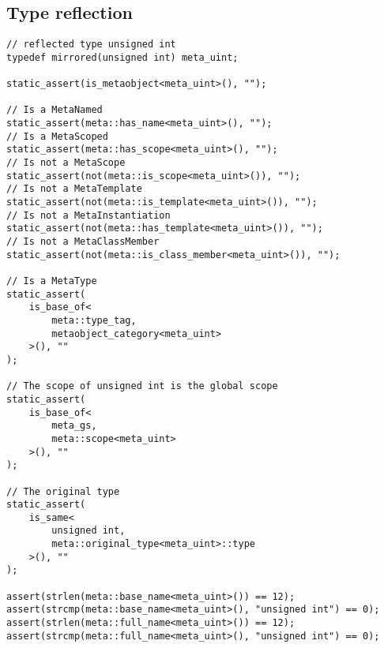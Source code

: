 \subsection{Type reflection}

\begin{verbatim}
// reflected type unsigned int
typedef mirrored(unsigned int) meta_uint;

static_assert(is_metaobject<meta_uint>(), "");

// Is a MetaNamed
static_assert(meta::has_name<meta_uint>(), "");
// Is a MetaScoped
static_assert(meta::has_scope<meta_uint>(), "");
// Is not a MetaScope
static_assert(not(meta::is_scope<meta_uint>()), "");
// Is not a MetaTemplate
static_assert(not(meta::is_template<meta_uint>()), "");
// Is not a MetaInstantiation
static_assert(not(meta::has_template<meta_uint>()), "");
// Is not a MetaClassMember
static_assert(not(meta::is_class_member<meta_uint>()), "");

// Is a MetaType
static_assert(
	is_base_of<
		meta::type_tag,
		metaobject_category<meta_uint>
	>(), ""
);

// The scope of unsigned int is the global scope
static_assert(
	is_base_of<
		meta_gs,
		meta::scope<meta_uint>
	>(), ""
);

// The original type
static_assert(
	is_same<
		unsigned int,
		meta::original_type<meta_uint>::type
	>(), ""
);

assert(strlen(meta::base_name<meta_uint>()) == 12);
assert(strcmp(meta::base_name<meta_uint>(), "unsigned int") == 0);
assert(strlen(meta::full_name<meta_uint>()) == 12);
assert(strcmp(meta::full_name<meta_uint>(), "unsigned int") == 0);
\end{verbatim}
